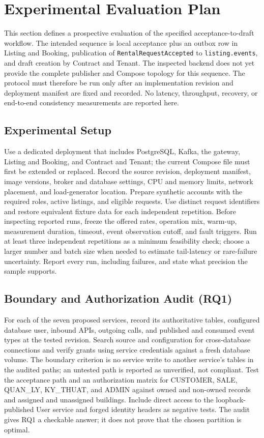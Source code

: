 \section{Experimental Evaluation Plan}\label{sec:evaluation}

This section defines a prospective evaluation of the specified acceptance-to-draft workflow. The intended sequence is local acceptance plus an outbox row in Listing and Booking, publication of \texttt{RentalRequestAccepted} to \texttt{listing.events}, and draft creation by Contract and Tenant. The inspected backend does not yet provide the complete publisher and Compose topology for this sequence. The protocol must therefore be run only after an implementation revision and deployment manifest are fixed and recorded. No latency, throughput, recovery, or end-to-end consistency measurements are reported here.

\subsection{Experimental Setup}
Use a dedicated deployment that includes PostgreSQL, Kafka, the gateway, Listing and Booking, and Contract and Tenant; the current Compose file must first be extended or replaced. Record the source revision, deployment manifest, image versions, broker and database settings, CPU and memory limits, network placement, and load-generator location. Prepare synthetic accounts with the required roles, active listings, and eligible requests. Use distinct request identifiers and restore equivalent fixture data for each independent repetition. Before inspecting reported runs, freeze the offered rates, operation mix, warm-up, measurement duration, timeout, event observation cutoff, and fault triggers. Run at least three independent repetitions as a minimum feasibility check; choose a larger number and batch size when needed to estimate tail-latency or rare-failure uncertainty. Report every run, including failures, and state what precision the sample supports.

\subsection{Boundary and Authorization Audit (RQ1)}
For each of the seven proposed services, record its authoritative tables, configured database user, inbound APIs, outgoing calls, and published and consumed event types at the tested revision. Search source and configuration for cross-database connections and verify grants using service credentials against a fresh database volume. The boundary criterion is no service write to another service's tables in the audited paths; an untested path is reported as unverified, not compliant. Test the acceptance path and an authorization matrix for CUSTOMER, SALE, QUAN\_LY, KY\_THUAT, and ADMIN against owned and non-owned records and assigned and unassigned buildings. Include direct access to the loopback-published User service and forged identity headers as negative tests. The audit gives RQ1 a checkable answer; it does not prove that the chosen partition is optimal.

